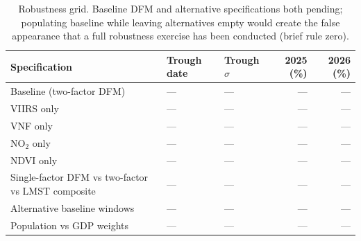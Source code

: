 \begin{table}[H]
\centering\scriptsize
\caption{Robustness grid. Baseline DFM and alternative specifications both pending; populating baseline while leaving alternatives empty would create the false appearance that a full robustness exercise has been conducted (brief rule zero).}
\label{tab:robustness}
\begin{tabular}{lllrr}
\toprule
Specification & Trough date & Trough $\sigma$ & 2025 (\%) & 2026 (\%) \\
\midrule
Baseline (two-factor DFM) & --- & --- & --- & --- \\
VIIRS only & --- & --- & --- & --- \\
VNF only & --- & --- & --- & --- \\
NO$_2$ only & --- & --- & --- & --- \\
NDVI only & --- & --- & --- & --- \\
Single-factor DFM vs two-factor vs LMST composite & --- & --- & --- & --- \\
Alternative baseline windows & --- & --- & --- & --- \\
Population vs GDP weights & --- & --- & --- & --- \\
\bottomrule
\end{tabular}
\end{table}